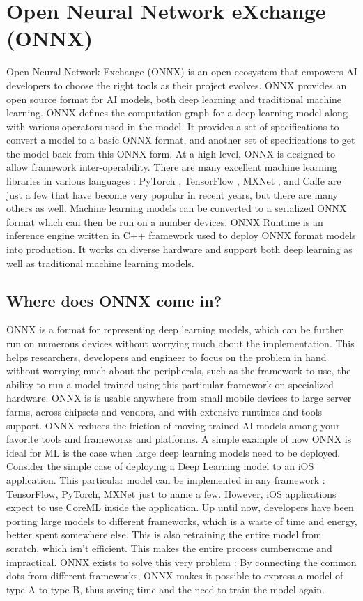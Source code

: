 \documentclass{juliacon}
\begin{document}
\section{Open Neural Network eXchange (ONNX)}
Open Neural Network Exchange (ONNX) \cite{bai2019} is an open ecosystem that empowers AI developers to
choose the right tools as their project evolves. ONNX provides an open source format for AI
models, both deep learning and traditional machine learning. ONNX defines the computation graph for a deep learning model along with various operators used in the model.
It provides a set of specifications to convert a model to a basic ONNX format, and
another set of specifications to get the model back from this ONNX form.   At a high
level, ONNX is designed to allow framework inter-operability. There are many excellent
machine learning libraries in various languages : PyTorch \cite{bai2019} , TensorFlow \cite{abadi2016tensorflow} , MXNet \cite{chen2015mxnet} , and Caffe \cite{jia2014caffe} are
just a few that have become very popular in recent years, but there are many others as well.
Machine learning models can be converted to a serialized ONNX format which can then be run
on a number devices. ONNX Runtime is an inference engine written in C++ framework used to 
deploy ONNX format models into production. It works on diverse hardware and support both
deep learning as well as traditional machine learning models.

\subsection{Where does ONNX come in?}
ONNX is a format for representing deep learning models, which can be further run on numerous devices
without worrying much about the implementation. This helps researchers, developers and engineer to
focus on the problem in hand without worrying much about the peripherals, such as the framework
to use, the ability to run a model trained using this particular framework on specialized hardware.
ONNX is is usable anywhere from small mobile devices to large server farms, across chipsets and vendors,
and with extensive runtimes and tools support. ONNX reduces the friction of moving trained AI
models among your favorite tools and frameworks and platforms. A simple example of how ONNX is ideal
for ML is the case when large deep learning models need to be deployed.     Consider 
the simple case of deploying a Deep Learning model to an iOS application. This particular model can 
be implemented in any framework : TensorFlow, PyTorch, MXNet just to name a few. However, iOS 
applications expect to use CoreML inside the application. Up until now, developers have been porting
large models to different frameworks,
which is a waste of time and energy, better spent somewhere else. This is also retraining the entire model from scratch, which isn't efficient. This makes the entire process cumbersome and impractical. ONNX exists to solve this very problem : By connecting the common dots from
different frameworks, ONNX makes it possible to express a model of type A to type B, thus saving time and the need to train the model again.  
\end{document}
